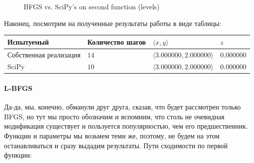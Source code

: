\documentclass[12pt, a4paper, oneside, final]{article}
\begin{document}
\begin{figure}[H]
		\caption*{BFGS vs. SciPy's on second function (levels)}
	\end{figure}
	Наконец, посмотрим на полученные результаты работы в виде таблицы:
	\begin{table}[H]
		\centering
		\begin{tabular}{l|l|l|l}
			Испытуемый & Количество шагов & $\langle x, y \rangle$ & $z$ \\ \hline
			Собственная реализация & $14$ & $\langle 3.000000, 2.000000 \rangle$ & $0.000000$ \\
			SciPy & $10$ & $\langle 3.000000, 2.000000 \rangle$ & $0.000000$
		\end{tabular}
	\end{table}
	\paragraph{L-BFGS}
	Да-да, мы, конечно, обманули друг друга, сказав, что будет рассмотрен только BFGS, но тут мы просто обозначим и вспомним, что столь не очевидная модификация существует и пользуется популярностью, чем его предшественник.
	Функции и параметры мы возьмем теми же, поэтому, не будем на этом останавливаться и сразу выдадим результаты.
	Пути сходимости по первой функции:
\end{document}

